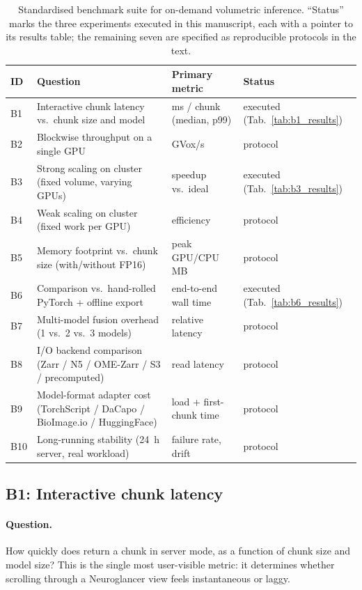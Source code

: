 \begin{table}[tbhp]
\centering
\caption{Standardised benchmark suite for on-demand volumetric inference. ``Status'' marks the three experiments executed in this manuscript, each with a pointer to its results table; the remaining seven are specified as reproducible protocols in the text.}
\label{tab:benchmarks}
\small
\begin{tabularx}{\textwidth}{l X l l}
\toprule
\textbf{ID} & \textbf{Question} & \textbf{Primary metric} & \textbf{Status} \\
\midrule
B1 & Interactive chunk latency vs.\ chunk size and model & ms / chunk (median, p99) & executed (Tab.~\ref{tab:b1_results}) \\
B2 & Blockwise throughput on a single GPU & GVox/s & protocol \\
B3 & Strong scaling on cluster (fixed volume, varying GPUs) & speedup vs.\ ideal & executed (Tab.~\ref{tab:b3_results}) \\
B4 & Weak scaling on cluster (fixed work per GPU) & efficiency & protocol \\
B5 & Memory footprint vs.\ chunk size (with/without FP16) & peak GPU/CPU MB & protocol \\
B6 & Comparison vs.\ hand-rolled PyTorch + offline export & end-to-end wall time & executed (Tab.~\ref{tab:b6_results}) \\
B7 & Multi-model fusion overhead (1 vs.\ 2 vs.\ 3 models) & relative latency & protocol \\
B8 & I/O backend comparison (Zarr / N5 / OME-Zarr / S3 / precomputed) & read latency & protocol \\
B9 & Model-format adapter cost (TorchScript / DaCapo / BioImage.io / HuggingFace) & load + first-chunk time & protocol \\
B10 & Long-running stability (24~h server, real workload) & failure rate, drift & protocol \\
\bottomrule
\end{tabularx}
\end{table}

\subsection*{B1: Interactive chunk latency}

\paragraph{Question.} How quickly does \cellmapflow{} return a chunk in server mode, as a function of chunk size and model size? This is the single most user-visible metric: it determines whether scrolling through a Neuroglancer view feels instantaneous or laggy.

